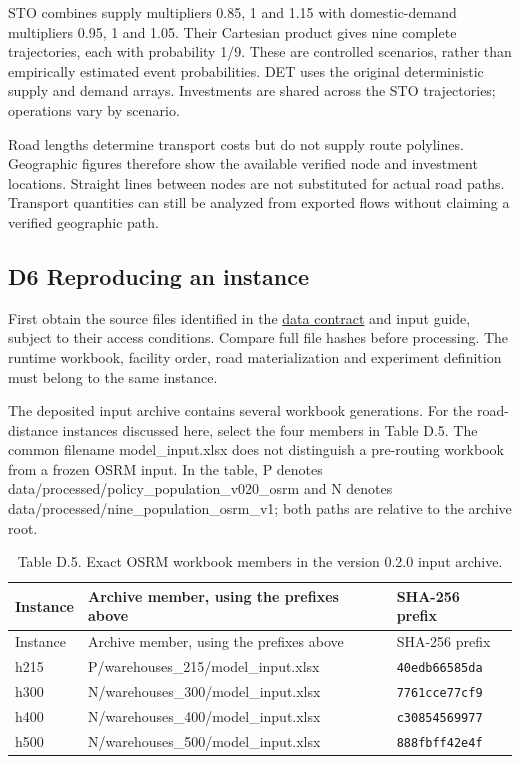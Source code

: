 \documentclass[
  english,
  11pt,
  a4paper,
]{article}
\begin{document}
STO combines supply multipliers 0.85, 1 and 1.15 with domestic-demand
multipliers 0.95, 1 and 1.05. Their Cartesian product gives nine
complete trajectories, each with probability 1/9. These are controlled
scenarios, rather than empirically estimated event probabilities. DET
uses the original deterministic supply and demand arrays. Investments
are shared across the STO trajectories; operations vary by scenario.

Road lengths determine transport costs but do not supply route
polylines. Geographic figures therefore show the available verified node
and investment locations. Straight lines between nodes are not
substituted for actual road paths. Transport quantities can still be
analyzed from exported flows without claiming a verified geographic
path.

\subsection{D6 Reproducing an
instance}\label{d6-reproducing-an-instance}

First obtain the source files identified in the
\href{https://github.com/unb-lamfo-or-ai-hpc/model-agrologistic/blob/1b54023f4e0c0c27aba64883b1e9cf25817ad0f8/data/manifests/mvp_data_contract.json}{data
contract} and input guide, subject to their access conditions. Compare
full file hashes before processing. The runtime workbook, facility
order, road materialization and experiment definition must belong to the
same instance.

The deposited input archive contains several workbook generations. For
the road-distance instances discussed here, select the four members in
Table D.5. The common filename model\_input.xlsx does not distinguish a
pre-routing workbook from a frozen OSRM input. In the table, P denotes
data/processed/policy\_population\_v020\_osrm and N denotes
data/processed/nine\_population\_osrm\_v1; both paths are relative to
the archive root.

\begin{longtable}[]{@{}lll@{}}
\caption{Table D.5. Exact OSRM workbook members in the version 0.2.0
input archive.}\tabularnewline
\toprule\noalign{}
Instance & Archive member, using the prefixes above & SHA-256 prefix \\
\midrule\noalign{}
\endfirsthead
\toprule\noalign{}
Instance & Archive member, using the prefixes above & SHA-256 prefix \\
\midrule\noalign{}
\endhead
\bottomrule\noalign{}
\endlastfoot
h215 & P/warehouses\_215/model\_input.xlsx & \texttt{40edb66585da} \\
h300 & N/warehouses\_300/model\_input.xlsx & \texttt{7761cce77cf9} \\
h400 & N/warehouses\_400/model\_input.xlsx & \texttt{c30854569977} \\
h500 & N/warehouses\_500/model\_input.xlsx & \texttt{888fbff42e4f} \\
\end{longtable}
\end{document}
